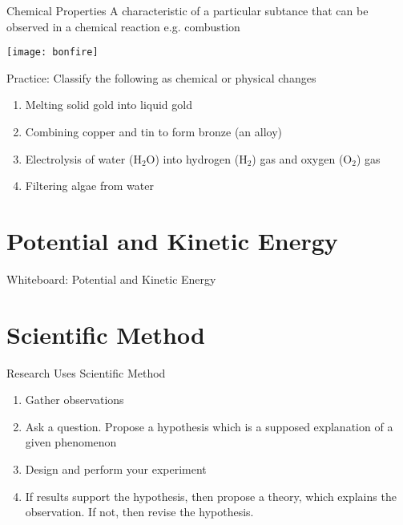 \documentclass[11pt]{beamer}
\begin{document}
\begin{frame}{Chemical Properties}
  A characteristic of a particular subtance that can be observed
  in a chemical reaction e.g. combustion

  \centering
  \texttt{[image: bonfire]}
\end{frame}

\begin{frame}{Practice: Classify the following as chemical or physical changes}
  \begin{enumerate}
  \item Melting solid gold into liquid gold
  \item Combining copper and tin to form bronze (an alloy)
  \item Electrolysis of water (H$_2$O) into hydrogen (H$_2$) gas and oxygen (O$_2$)
    gas
  \item Filtering algae from water
  \end{enumerate}
\end{frame}

\section{Potential and Kinetic Energy}

\begin{frame}{Whiteboard: Potential and Kinetic Energy}
\end{frame}

\section{Scientific Method}

\begin{frame}{Research Uses Scientific Method}
  \begin{enumerate}
  \item Gather observations
  \item Ask a question. Propose a hypothesis
    which is a supposed explanation of a given phenomenon
  \item Design and perform your experiment
  \item If results support the hypothesis, then propose
    a theory, which explains the observation. If not, then revise
    the hypothesis.
  \end{enumerate}
\end{frame}
\end{document}
